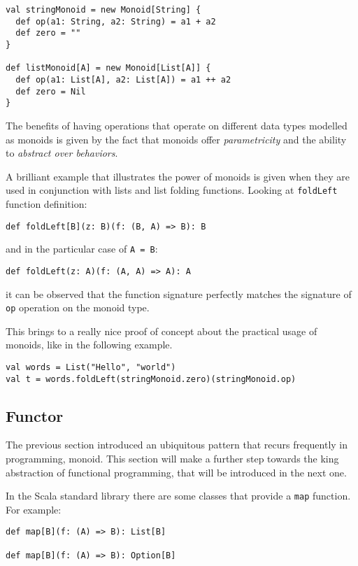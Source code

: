 \begin{verbatim}
val stringMonoid = new Monoid[String] {
  def op(a1: String, a2: String) = a1 + a2
  def zero = ""
}

def listMonoid[A] = new Monoid[List[A]] {
  def op(a1: List[A], a2: List[A]) = a1 ++ a2
  def zero = Nil
}
\end{verbatim}

The benefits of having operations that operate on different data types
modelled as monoids is given by the fact that monoids offer
\emph{parametricity} and the ability to \emph{abstract over behaviors}.

A brilliant example that illustrates the power of monoids is given when
they are used in conjunction with lists and list folding functions.
Looking at \texttt{foldLeft} function definition:

\begin{verbatim}
def foldLeft[B](z: B)(f: (B, A) => B): B
\end{verbatim}

and in the particular case of \texttt{A\ =\ B}:

\begin{verbatim}
def foldLeft(z: A)(f: (A, A) => A): A
\end{verbatim}

it can be observed that the function signature perfectly matches the
signature of \texttt{op} operation on the monoid type.

This brings to a really nice proof of concept about the practical usage
of monoids, like in the following example.

\begin{verbatim}
val words = List("Hello", "world")
val t = words.foldLeft(stringMonoid.zero)(stringMonoid.op)
\end{verbatim}

\subsection{Functor}\label{functor}

The previous section introduced an ubiquitous pattern that recurs
frequently in programming, monoid. This section will make a further step
towards the king abstraction of functional programming, that will be
introduced in the next one.

In the Scala standard library there are some classes that provide a
\texttt{map} function. For example:

\begin{verbatim}
def map[B](f: (A) => B): List[B]

def map[B](f: (A) => B): Option[B]
\end{verbatim}

